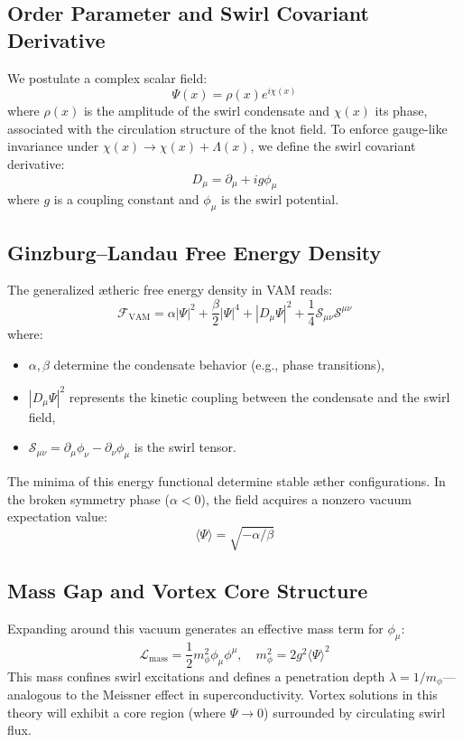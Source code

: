 \subsection{Order Parameter and Swirl Covariant Derivative}
We postulate a complex scalar field:
\begin{equation}
    \Psi(x) = \rho(x) e^{i\chi(x)}
\end{equation}
where $\rho(x)$ is the amplitude of the swirl condensate and $\chi(x)$ its phase, associated with the circulation structure of the knot field. To enforce gauge-like invariance under $\chi(x) \rightarrow \chi(x) + \Lambda(x)$, we define the swirl covariant derivative:
\begin{equation}
    D_\mu = \partial_\mu + i g \phi_\mu
\end{equation}
where $g$ is a coupling constant and $\phi_\mu$ is the swirl potential.

\subsection{Ginzburg--Landau Free Energy Density}
The generalized ætheric free energy density in VAM reads:
\begin{equation}
    \mathcal{F}_{\text{VAM}} = \alpha |\Psi|^2 + \frac{\beta}{2} |\Psi|^4 + |D_\mu \Psi|^2 + \frac{1}{4} \mathcal{S}_{\mu\nu} \mathcal{S}^{\mu\nu}
\end{equation}
where:
\begin{itemize}
    \item $\alpha, \beta$ determine the condensate behavior (e.g., phase transitions),
    \item $|D_\mu \Psi|^2$ represents the kinetic coupling between the condensate and the swirl field,
    \item $\mathcal{S}_{\mu\nu} = \partial_\mu \phi_\nu - \partial_\nu \phi_\mu$ is the swirl tensor.
\end{itemize}

The minima of this energy functional determine stable æther configurations. In the broken symmetry phase ($\alpha < 0$), the field acquires a nonzero vacuum expectation value:
\begin{equation}
    \langle \Psi \rangle = \sqrt{-\alpha/\beta}
\end{equation}

\subsection{Mass Gap and Vortex Core Structure}
Expanding around this vacuum generates an effective mass term for $\phi_\mu$:
\begin{equation}
    \mathcal{L}_{\text{mass}} = \frac{1}{2} m_\phi^2 \phi_\mu \phi^\mu, \quad m_\phi^2 = 2 g^2 \langle \Psi \rangle^2
\end{equation}
This mass confines swirl excitations and defines a penetration depth $\lambda = 1/m_\phi$---analogous to the Meissner effect in superconductivity. Vortex solutions in this theory will exhibit a core region (where $\Psi \rightarrow 0$) surrounded by circulating swirl flux.

